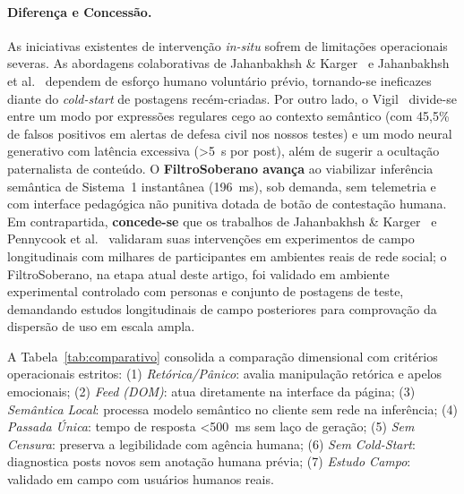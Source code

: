 \documentclass[runningheads]{llncs}
\begin{document}
\paragraph{Diferença e Concessão.} As iniciativas existentes de intervenção \textit{in-situ} sofrem de limitações operacionais severas. As abordagens colaborativas de Jahanbakhsh \& Karger~\cite{jahanbakhsh2024browser} e Jahanbakhsh et al.~\cite{jahanbakhsh2022our} dependem de esforço humano voluntário prévio, tornando-se ineficazes diante do \textit{cold-start} de postagens recém-criadas. Por outro lado, o Vigil~\cite{kang2026vigil} divide-se entre um modo por expressões regulares cego ao contexto semântico (com 45,5\% de falsos positivos em alertas de defesa civil nos nossos testes) e um modo neural generativo com latência excessiva (>5~s por post), além de sugerir a ocultação paternalista de conteúdo. O \textbf{FiltroSoberano avança} ao viabilizar inferência semântica de Sistema~1 instantânea (196~ms), sob demanda, sem telemetria e com interface pedagógica não punitiva dotada de botão de contestação humana. Em contrapartida, \textbf{concede-se} que os trabalhos de Jahanbakhsh \& Karger~\cite{jahanbakhsh2024browser} e Pennycook et al.~\cite{pennycook2021shifting} validaram suas intervenções em experimentos de campo longitudinais com milhares de participantes em ambientes reais de rede social; o FiltroSoberano, na etapa atual deste artigo, foi validado em ambiente experimental controlado com personas e conjunto de postagens de teste, demandando estudos longitudinais de campo posteriores para comprovação da dispersão de uso em escala ampla.

A Tabela~\ref{tab:comparativo} consolida a comparação dimensional com critérios operacionais estritos: (1) \textit{Retórica/Pânico}: avalia manipulação retórica e apelos emocionais; (2) \textit{Feed (DOM)}: atua diretamente na interface da página; (3) \textit{Semântica Local}: processa modelo semântico no cliente sem rede na inferência; (4) \textit{Passada Única}: tempo de resposta <500~ms sem laço de geração; (5) \textit{Sem Censura}: preserva a legibilidade com agência humana; (6) \textit{Sem Cold-Start}: diagnostica posts novos sem anotação humana prévia; (7) \textit{Estudo Campo}: validado em campo com usuários humanos reais.
\end{document}
